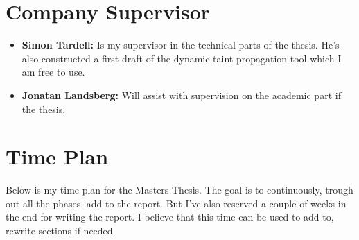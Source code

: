 \documentclass{../kththesis}
\begin{document}
\section{Company Supervisor}
\begin{itemize}
	\item \textbf{Simon Tardell:} Is my supervisor in the technical parts of the thesis. He's also constructed a first draft of the dynamic taint propagation tool which I am free to use.
	\item \textbf{Jonatan Landsberg:} Will assist with supervision on the academic part if the thesis.
\end{itemize}


\section{Time Plan}
Below is my time plan for the Masters Thesis. The goal is to continuously, trough out all the phases, add to the report. But I've also reserved a couple of weeks in the end for writing the report. I believe that this time can be used to add to, rewrite sections if needed.  \\ \\

\begin{ganttchart}[vgrid, hgrid, today=3]{1}{20}
	 \\
	\\
	 \\
	 \\
	 \\
	 \\
	 \\
\end{ganttchart}

\printbibliography[heading=bibintoc] %
\end{document}
